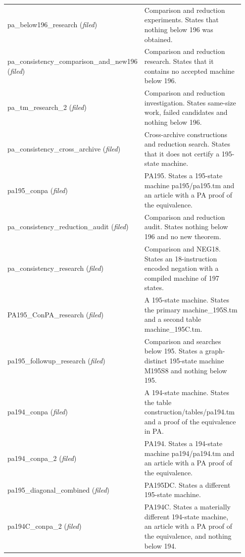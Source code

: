 \begin{longtable}{@{}p{0.33\linewidth}p{0.62\linewidth}@{}}
pa\_\allowbreak{}below196\_\allowbreak{}research (\emph{filed}) & Comparison and reduction experiments. States that nothing below 196 was obtained. \\
pa\_\allowbreak{}consistency\_\allowbreak{}comparison\_\allowbreak{}and\_\allowbreak{}new196 (\emph{filed}) & Comparison and reduction research. States that it contains no accepted machine below 196. \\
pa\_\allowbreak{}tm\_\allowbreak{}research\_\allowbreak{}2 (\emph{filed}) & Comparison and reduction investigation. States same-size work, failed candidates and nothing below 196. \\
pa\_\allowbreak{}consistency\_\allowbreak{}cross\_\allowbreak{}archive (\emph{filed}) & Cross-archive constructions and reduction search. States that it does not certify a 195-state machine. \\
pa195\_\allowbreak{}conpa (\emph{filed}) & PA195. States a 195-state machine pa195/pa195.tm and an article with a PA proof of the equivalence. \\
pa\_\allowbreak{}consistency\_\allowbreak{}reduction\_\allowbreak{}audit (\emph{filed}) & Comparison and reduction audit. States nothing below 196 and no new theorem. \\
pa\_\allowbreak{}consistency\_\allowbreak{}research (\emph{filed}) & Comparison and NEG18. States an 18-instruction encoded negation with a compiled machine of 197 states. \\
PA195\_\allowbreak{}ConPA\_\allowbreak{}research (\emph{filed}) & A 195-state machine. States the primary machine\_195S.tm and a second table machine\_195C.tm. \\
pa195\_\allowbreak{}followup\_\allowbreak{}research (\emph{filed}) & Comparison and searches below 195. States a graph-distinct 195-state machine M195S8 and nothing below 195. \\
pa194\_\allowbreak{}conpa (\emph{filed}) & A 194-state machine. States the table construction/tables/pa194.tm and a proof of the equivalence in PA. \\
pa194\_\allowbreak{}conpa\_\allowbreak{}2 (\emph{filed}) & PA194. States a 194-state machine pa194/pa194.tm and an article with a PA proof of the equivalence. \\
pa195\_\allowbreak{}diagonal\_\allowbreak{}combined (\emph{filed}) & PA195DC. States a different 195-state machine. \\
pa194C\_\allowbreak{}conpa\_\allowbreak{}2 (\emph{filed}) & PA194C. States a materially different 194-state machine, an article with a PA proof of the equivalence, and nothing below 194. \\

\end{longtable}
